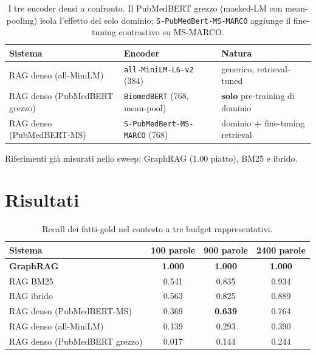 \documentclass[11pt,a4paper]{report}
\begin{document}
\begin{table}[H]
\centering
\begin{tabularx}{\textwidth}{@{}llX@{}}
\toprule
\textbf{Sistema} & \textbf{Encoder} & \textbf{Natura} \\
\midrule
RAG denso (all-MiniLM) & \texttt{all-MiniLM-L6-v2} (384) & generico, retrieval-tuned \\
RAG denso (PubMedBERT grezzo) & \texttt{BiomedBERT} (768, mean-pool) & \textbf{solo} pre-training di dominio \\
RAG denso (PubMedBERT-MS) & \texttt{S-PubMedBert-MS-MARCO} (768) & dominio \textbf{+} fine-tuning retrieval \\
\bottomrule
\end{tabularx}
\caption{I tre encoder densi a confronto. Il PubMedBERT grezzo (masked-LM con
mean-pooling) isola l'effetto del solo dominio; \texttt{S-PubMedBert-MS-MARCO}
aggiunge il fine-tuning contrastivo su MS-MARCO.}
\end{table}

Riferimenti già misurati nello sweep: GraphRAG (\num{1,00} piatto), BM25 e
ibrido.

\section{Risultati}

\begin{table}[H]
\centering
\begin{tabular}{@{}lccc@{}}
\toprule
\textbf{Sistema} & \textbf{\num{100} parole} & \textbf{\num{900} parole} & \textbf{\num{2400} parole} \\
\midrule
\textbf{GraphRAG} & \textbf{\num{1,000}} & \textbf{\num{1,000}} & \textbf{\num{1,000}} \\
RAG BM25 & \num{0,541} & \num{0,835} & \num{0,934} \\
RAG ibrido & \num{0,563} & \num{0,825} & \num{0,889} \\
RAG denso (PubMedBERT-MS) & \num{0,369} & \textbf{\num{0,639}} & \num{0,764} \\
RAG denso (all-MiniLM) & \num{0,139} & \num{0,293} & \num{0,390} \\
RAG denso (PubMedBERT grezzo) & \num{0,017} & \num{0,144} & \num{0,244} \\
\bottomrule
\end{tabular}
\caption{Recall dei fatti-gold nel contesto a tre budget rappresentativi.}
\end{table}
\end{document}
